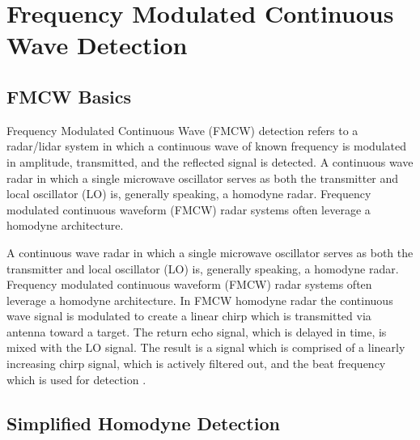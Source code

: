 \chapter{Frequency Modulated Continuous Wave Detection}

\section{FMCW Basics}
Frequency Modulated Continuous Wave (FMCW) detection refers to a radar/lidar 
system in which a continuous wave of known frequency is modulated in amplitude,
transmitted, and the reflected signal is detected. A continuous wave radar in 
which a single microwave oscillator serves as both
the transmitter and local oscillator (LO) is, generally speaking, a homodyne radar.
Frequency modulated continuous waveform (FMCW) radar systems often leverage a 
homodyne architecture.




A continuous wave radar in which a single microwave oscillator serves as both
the transmitter and local oscillator (LO) is, generally speaking, a homodyne radar.
Frequency modulated continuous waveform (FMCW) radar systems often leverage a 
homodyne architecture. In FMCW homodyne radar the continuous wave signal is modulated
to create a linear chirp which is transmitted via antenna toward a target. The return
echo signal, which is delayed in time, is mixed with the LO signal. The result is a signal 
which is comprised of a linearly increasing chirp signal, which is actively filtered out, and 
the beat frequency which is used for detection \cite{brooker2009}. 

\section{Simplified Homodyne Detection}